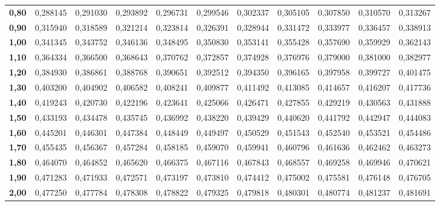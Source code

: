 \begin{tabular}{|r||rrrrr|rrrrr|}
{\bf 0,80} &   0,288145 &   0,291030 &   0,293892 &   0,296731 &   0,299546 &   0,302337 &   0,305105 &   0,307850 &   0,310570 &   0,313267 \\

{\bf 0,90} &   0,315940 &   0,318589 &   0,321214 &   0,323814 &   0,326391 &   0,328944 &   0,331472 &   0,333977 &   0,336457 &   0,338913 \\
\hline  \hline
{\bf 1,00} &   0,341345 &   0,343752 &   0,346136 &   0,348495 &   0,350830 &   0,353141 &   0,355428 &   0,357690 &   0,359929 &   0,362143 \\

{\bf 1,10} &   0,364334 &   0,366500 &   0,368643 &   0,370762 &   0,372857 &   0,374928 &   0,376976 &   0,379000 &   0,381000 &   0,382977 \\

{\bf 1,20} &   0,384930 &   0,386861 &   0,388768 &   0,390651 &   0,392512 &   0,394350 &   0,396165 &   0,397958 &   0,399727 &   0,401475 \\

{\bf 1,30} &   0,403200 &   0,404902 &   0,406582 &   0,408241 &   0,409877 &   0,411492 &   0,413085 &   0,414657 &   0,416207 &   0,417736 \\

{\bf 1,40} &   0,419243 &   0,420730 &   0,422196 &   0,423641 &   0,425066 &   0,426471 &   0,427855 &   0,429219 &   0,430563 &   0,431888 \\
\hline
{\bf 1,50} &   0,433193 &   0,434478 &   0,435745 &   0,436992 &   0,438220 &   0,439429 &   0,440620 &   0,441792 &   0,442947 &   0,444083 \\

{\bf 1,60} &   0,445201 &   0,446301 &   0,447384 &   0,448449 &   0,449497 &   0,450529 &   0,451543 &   0,452540 &   0,453521 &   0,454486 \\

{\bf 1,70} &   0,455435 &   0,456367 &   0,457284 &   0,458185 &   0,459070 &   0,459941 &   0,460796 &   0,461636 &   0,462462 &   0,463273 \\

{\bf 1,80} &   0,464070 &   0,464852 &   0,465620 &   0,466375 &   0,467116 &   0,467843 &   0,468557 &   0,469258 &   0,469946 &   0,470621 \\

{\bf 1,90} &   0,471283 &   0,471933 &   0,472571 &   0,473197 &   0,473810 &   0,474412 &   0,475002 &   0,475581 &   0,476148 &   0,476705 \\
\hline \hline
{\bf 2,00} &   0,477250 &   0,477784 &   0,478308 &   0,478822 &   0,479325 &   0,479818 &   0,480301 &   0,480774 &   0,481237 &   0,481691 \\


\end{tabular}
